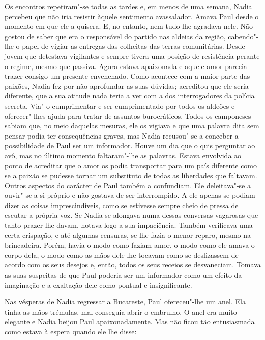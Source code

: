 Os encontros repetiram"-se todas as tardes e, em menos de uma semana,
Nadia percebeu que não iria resistir àquele sentimento avassalador.
Amava Paul desde o momento em
que ele a quisera. E, no entanto, nem tudo lhe agradava nele. Não gostou
de saber que era o responsável do partido nas aldeias da região,
cabendo"-lhe o papel de vigiar as entregas das colheitas das terras
comunitárias. Desde jovem que detestava vigilantes e sempre tivera uma
posição de resistência perante o regime, mesmo que passiva. Agora estava
apaixonada e aquele amor parecia trazer consigo um presente envenenado.
Como acontece com a maior parte das paixões, Nadia fez por não
aprofundar as suas dúvidas; acreditou que ele seria diferente, que a sua
atitude nada teria a ver com a dos interrogadores da polícia secreta.
Via"-o cumprimentar e ser cumprimentado por todos os aldeões e
oferecer"-lhes ajuda para tratar de assuntos burocráticos. Todos os
camponeses sabiam que, no meio daquelas mesuras, ele os vigiava e que
uma palavra dita sem pensar podia ter consequências graves, mas Nadia
recusou"-se a conceber a possibilidade de Paul ser um informador. Houve
um dia que o quis perguntar ao avô, mas no último momento faltaram"-lhe
as palavras. Estava envolvida ao ponto de acreditar que o amor os
podia transportar para um país diferente como se a paixão se pudesse
tornar um substituto de todas as liberdades que faltavam. Outros
aspectos do carácter de Paul também a confundiam. Ele deleitava"-se a
ouvir"-se a si próprio e não gostava de ser interrompido. A ele apenas se
podiam dizer as coisas imprescindíveis, como se estivesse sempre cheio
de pressa de escutar a própria voz. Se Nadia se alongava numa dessas
conversas vagarosas que tanto prazer lhe davam, notava logo a sua
impaciência. Também verificava uma certa crispação, e até algumas
censuras, se lhe fazia
o menor reparo, mesmo na brincadeira. Porém, havia o modo como faziam
amor, o modo como ele amava o corpo dela, o modo como as mãos dele lhe
tocavam como se deslizassem de acordo com os seus desejos e, então,
todos os seus receios se desvaneciam. Tomava as suas suspeitas de que
Paul poderia ser um informador como um efeito da imaginação e a
exaltação dele como pontual e insignificante.

Nas vésperas de Nadia regressar a Bucareste, Paul ofereceu"-lhe um anel.
Ela tinha as mãos trémulas, mal conseguia abrir o embrulho. O anel era
muito elegante e Nadia beijou Paul apaixonadamente. Mas não ficou tão
entusiasmada como estava à espera quando ele lhe disse:

